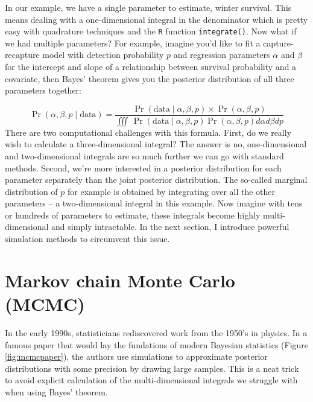 \documentclass[
  12pt,
]{krantz}
\begin{document}
In our example, we have a single parameter to estimate, winter survival. This means dealing with a one-dimensional integral in the denominator which is pretty easy with quadrature techniques and the \texttt{R} function \texttt{integrate()}. Now what if we had multiple parameters? For example, imagine you'd like to fit a capture-recapture model with detection probability \(p\) and regression parameters \(\alpha\) and \(\beta\) for the intercept and slope of a relationship between survival probability and a covariate, then Bayes' theorem gives you the posterior distribution of all three parameters together:

\[ \Pr(\alpha, \beta, p \mid \text{data}) = \frac{ \Pr(\text{data} \mid \alpha, \beta, p) \times \Pr(\alpha, \beta, p)}{\iiint \, \Pr(\text{data} \mid \alpha, \beta, p) \Pr(\alpha, \beta, p) d\alpha d\beta dp} \]
There are two computational challenges with this formula. First, do we really wish to calculate a three-dimensional integral? The answer is no, one-dimensional and two-dimensional integrals are so much further we can go with standard methods. Second, we're more interested in a posterior distribution for each parameter separately than the joint posterior distribution. The so-called marginal distribution of \(p\) for example is obtained by integrating over all the other parameters -- a two-dimensional integral in this example. Now imagine with tens or hundreds of parameters to estimate, these integrals become highly multi-dimensional and simply intractable. In the next section, I introduce powerful simulation methods to circumvent this issue.

\hypertarget{markov-chain-monte-carlo-mcmc}{%
\section{Markov chain Monte Carlo (MCMC)}\label{markov-chain-monte-carlo-mcmc}}

In the early 1990s, statisticians rediscovered work from the 1950's in physics. In a famous paper that would lay the fundations of modern Bayesian statistics (Figure \ref{fig:mcmcpaper}), the authors use simulations to approximate posterior distributions with some precision by drawing large samples. This is a neat trick to avoid explicit calculation of the multi-dimensional integrals we struggle with when using Bayes' theorem.
\end{document}
